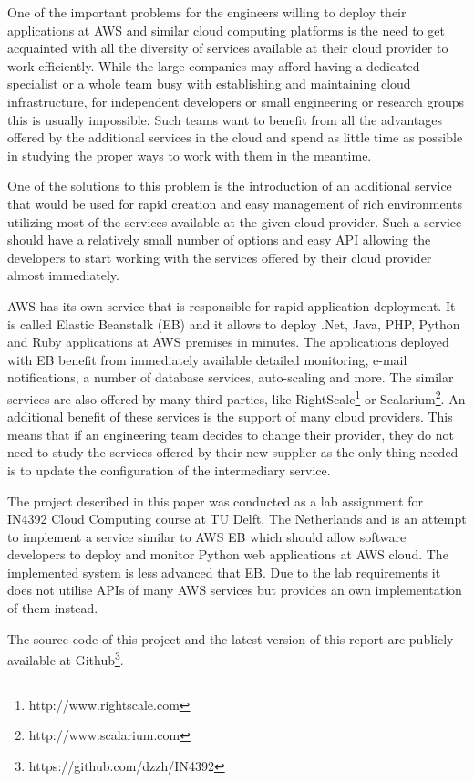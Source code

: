 \documentclass[conference]{IEEEtran}
\begin{document}
One of the important problems for the engineers willing to deploy their applications at AWS and similar cloud computing platforms is the need to get acquainted with all the diversity of services available at their cloud provider to work efficiently. While the large companies may afford having a dedicated specialist or a whole team busy with establishing and maintaining cloud infrastructure, for independent developers or small engineering or research groups this is usually impossible. Such teams want to benefit from all the advantages offered by the additional services in the cloud and spend as little time as possible in studying the proper ways to work with them in the meantime.

One of the solutions to this problem is the introduction of an additional service that would be used for rapid creation and easy management of rich environments utilizing most of the services available at the given cloud provider. Such a service should have a relatively small number of options and easy API allowing the developers to start working with the services offered by their cloud provider almost immediately. 

AWS has its own service that is responsible for rapid application deployment. It is called Elastic Beanstalk (EB) and it allows to deploy .Net, Java, PHP, Python and Ruby applications at AWS premises in minutes. The applications deployed with EB benefit from immediately available detailed monitoring, e-mail notifications, a number of database services, auto-scaling and more. The similar services are also offered by many third parties, like RightScale\footnote{http://www.rightscale.com} or Scalarium\footnote{http://www.scalarium.com}. An additional benefit of these services is the support of many cloud providers. This means that if an engineering team decides to change their provider, they do not need to study the services offered by their new supplier as the only thing needed is to update the configuration of the intermediary service.

The project described in this paper was conducted as a lab assignment for IN4392 Cloud Computing course at TU Delft, The Netherlands and is an attempt to implement a service similar to AWS EB which should allow software developers to deploy and monitor Python web applications at AWS cloud. The implemented system is less advanced that EB. Due to the lab requirements it does not utilise APIs of many AWS services but provides an own implementation of them instead.

The source code of this project and the latest version of this report are publicly available at Github\footnote{https://github.com/dzzh/IN4392}.
\end{document}
